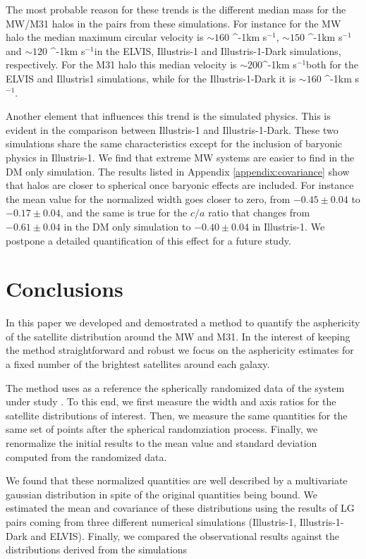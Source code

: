 \documentclass[a4paper,fleqn,usenatbib]{mnras}
\newcommand{\kms}{\ifmmode\mathrm{km\ s}^{-1}\else km s$^{-1}$\fi}
\begin{document}
The most probable reason for these trends is the different median mass
for the MW/M31 halos in the pairs from these simulations. 
For instance for the MW halo the median maximum circular velocity is
$\sim 160$ \kms, $\sim 150$ \kms and $\sim 120$ \kms in the ELVIS,
Illustris-1 and Illustris-1-Dark simulations, respectively.
For the M31 halo this median velocity is $\sim 200$\kms both for the
ELVIS and Illustris1 simulations, while for the Illustris-1-Dark it is
$\sim 160$ \kms. 

Another element that influences this trend is the simulated physics.
This is evident in the comparison between Illustris-1 and Illustris-1-Dark.
These two simulations share the same characteristics except for the
inclusion of baryonic physics in Illustris-1.
We find that extreme MW systems are easier to find in the DM only
simulation. 
The results listed in Appendix \ref{appendix:covariance} show that
halos are closer to spherical once baryonic effects are included. 
For instance the mean value for the normalized width goes closer to
zero, from $-0.45\pm 0.04$  to $-0.17\pm0.04$, and the same is true
for the $c/a$ ratio that changes from $-0.61\pm0.04$ in the DM only
simulation to $-0.40\pm 0.04$ in Illustris-1.  
We postpone a detailed quantification of this effect for a future
study. 

\section{Conclusions}\label{sec:conclusions}

In this paper we developed and demostrated a method to quantify the
asphericity of the satellite distribution around the MW and M31.  
In the interest of keeping the method straightforward and robust we
focus on the asphericity estimates for a fixed number of the brightest
satellites around each galaxy. 

The method uses as a reference the spherically randomized data
of the system under study \citep{2017AN....338..854P}.  
To this end, we first measure the width and axis ratios for the satellite
distributions of interest. 
Then, we measure the same quantities for the same set of points after
the spherical randomziation process.
Finally, we renormalize the initial results to the mean value and
standard deviation computed from the randomized data.  

We found that these normalized quantities are well described by
a multivariate gaussian distribution in spite of the original
quantities being bound.
We estimated the mean and covariance of these distributions using
the results of LG pairs coming from three different numerical
simulations (Illustris-1, Illustris-1-Dark and ELVIS). 
Finally, we compared the observational results against the
distributions derived from the simulations
\end{document}
